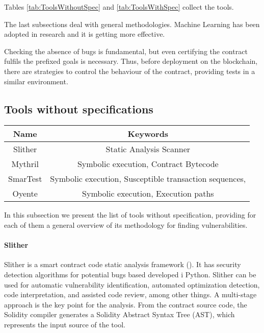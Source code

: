 \documentclass[a4paper,sigconf, language=french,
language=german, language=spanish, language=english]{acmart}
\begin{document}
Tables \ref{tab:ToolsWithoutSpec} and \ref{tab:ToolsWithSpec} collect the tools. 

The last subsections deal with general methodologies.
Machine Learning has been adopted in research and it is getting more effective. 

Checking the absence of bugs is fundamental, but even certifying the contract fulfils the prefixed goals is necessary. Thus, before deployment on the blockchain, there are strategies to control the behaviour of the contract, providing tests in a similar environment.

\subsection{Tools without specifications}
\label{ToolsWithouSpecifications}
\begin{table*}
  \caption{Tools without Specifications}
  \label{tab:ToolsWithoutSpec}
  \begin{tabular}{cc}
  \toprule
    Name & Keywords\\
    \midrule
    Slither & Static Analysis Scanner\\
    Mythril & Symbolic execution, Contract Bytecode \\
    SmarTest & Symbolic execution, Susceptible transaction sequences,\\
    Oyente  & Symbolic execution, Execution paths \\
    \bottomrule
 \end{tabular}
\end{table*}

In this subsection we present the list of tools without specification, providing for each of them a general overview of its methodology for finding vulnerabilities.

\paragraph{Slither} 
Slither is a smart contract code static analysis framework (\cite{Slither}).
It has security detection algorithms for potential bugs based developed i Python.
Slither can be used for automatic vulnerability identification, automated optimization detection, code interpretation, and assisted code review, among other things.
A multi-stage approach is the key point for the analysis.
From the contract source code, the Solidity compiler generates a Solidity Abstract Syntax Tree (AST), which represents the input source of the tool.
\end{document}
